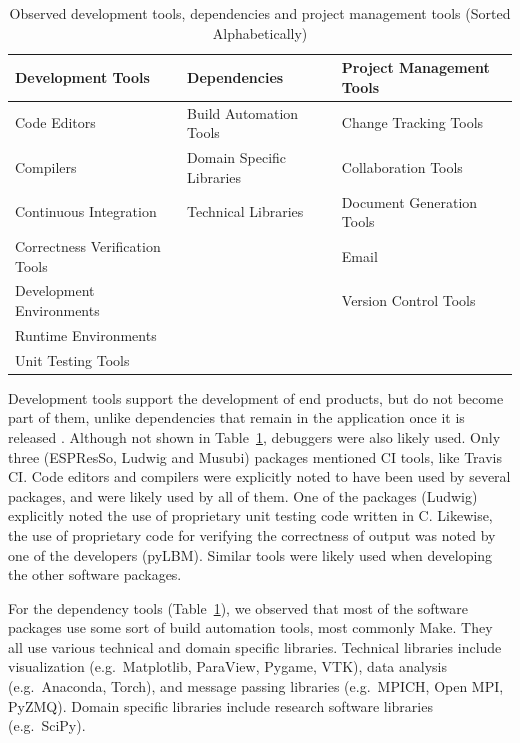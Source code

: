 \documentclass[final, 3p, times, authoryear]{elsarticle}
\begin{document}
\begin{table}[ht!]
	\begin{center}
	\begin{tabular}{ p{5.3 cm} p{4.9 cm} p{5 cm}}
	\toprule
	\textbf{Development Tools} & \textbf{Dependencies} & \textbf{Project
	Management Tools} \\
	\midrule
	Code Editors & Build Automation Tools & Change Tracking Tools\\
	Compilers & Domain Specific Libraries & Collaboration Tools\\
	Continuous Integration & Technical Libraries & Document Generation Tools\\
	Correctness Verification Tools &  & Email\\
	Development Environments &  & Version Control Tools\\
	Runtime Environments &  & \\
	Unit Testing Tools &  & \\
	\bottomrule
	\end{tabular}
	\caption{Observed development tools, dependencies and project management
	tools (Sorted Alphabetically)} \label{tbl_tools}
	\end{center}
\end{table}

Development tools support the development of end products, but do not become
part of them, unlike dependencies that remain in the application once it is
released \citep[p.\ 506]{GhezziEtAl2003}. Although not shown in
Table~\ref{tbl_tools}, debuggers were also likely used.  Only three (ESPResSo,
Ludwig and Musubi) packages mentioned CI tools, like Travis
CI. Code editors and compilers were explicitly noted to have been used by
several packages, and were likely used by all of them. One of the packages
(Ludwig) explicitly noted the use of proprietary unit testing code written in C.
Likewise, the use of proprietary code for verifying the correctness of output
was noted by one of the developers (pyLBM). Similar tools were likely used when
developing the other software packages.

For the dependency tools (Table~\ref{tbl_tools}), we observed that most of the
software packages use some sort of build automation tools, most commonly Make.
They all use various technical and domain specific libraries. Technical
libraries include visualization (e.g.\ Matplotlib, ParaView, Pygame, VTK), data
analysis (e.g.\ Anaconda, Torch), and message passing libraries (e.g.\ MPICH,
Open MPI, PyZMQ). Domain specific libraries include research software libraries
(e.g.\ SciPy).
\end{document}
